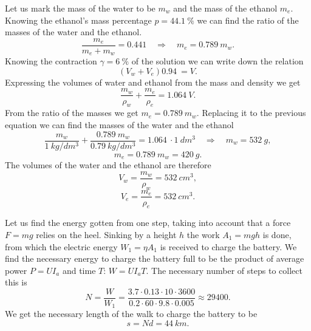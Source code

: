\documentclass[11pt]{article}
\begin{document}

\solueng
Let us mark the mass of the water to be $m_w$ and the mass of the ethanol $m_e$. Knowing the ethanol’s mass percentage $p = \SI{44,1}{\percent}$ we can find the ratio of the masses of the water and the ethanol. 
\[ \frac{m_e}{m_e+m_w}=\SI{0,441}  \quad\Rightarrow\quad m_e=\SI{0,789}{}m_w.\]
Knowing the contraction $\gamma = \SI{6}{\percent}$ of the solution we can write down the relation
\[ (V_w + V_e)\SI{0,94}{} = V.\]
Expressing the volumes of water and ethanol from the mass and density we get
\[ \frac{m_w}{\rho_w} + \frac{m_e}{\rho_e} = \SI{1,064}{}V.\]
From the ratio of the masses we get $m_e=\SI{0,789}{}m_w$. Replacing it to the previous equation we can find the masses of the water and the ethanol
\[ \frac{m_w}{\SI{1}{kg/dm^3}} + \frac{\SI{0,789}{}{m_w}}{\SI{0,79}{kg/dm^3}} = \SI{1,064}{}\cdot\SI{1}{dm^3} \quad\Rightarrow\quad
m_w = \SI{532}{g},\]
\[ m_e = \SI{0,789}{}m_w =  \SI{420}{g}.\]
The volumes of the water and the ethanol are therefore
\[ V_w = \frac{m_w}{\rho_w} = \SI{532}{cm^3},\]
\[ V_e = \frac{m_e}{\rho_e} =  \SI{532}{cm^3}.\]
\probend
\bigskip


\solueng
Let us find the energy gotten from one step, taking into account that a force $F=mg$ relies on the heel. Sinking by a height $h$ the work $A_1 = mgh$ is done, from which the electric energy $W_1=\eta A_1$ is received to charge the battery. We find the necessary energy to charge the battery full to be the product of average power $P=UI_a$ and time $T$: $W=UI_aT$. The necessary number of steps to collect this is 
\[N = \frac{W}{W_1} = \frac{3.7 \cdot 0.13 \cdot 10 \cdot 3600 }{0.2 \cdot 60\cdot 9.8 \cdot 0.005}\approx29400.\]
We get the necessary length of the walk to charge the battery to be
\[s=Nd = \SI{44}{km}.\]
\probend
\bigskip

\end{document}
